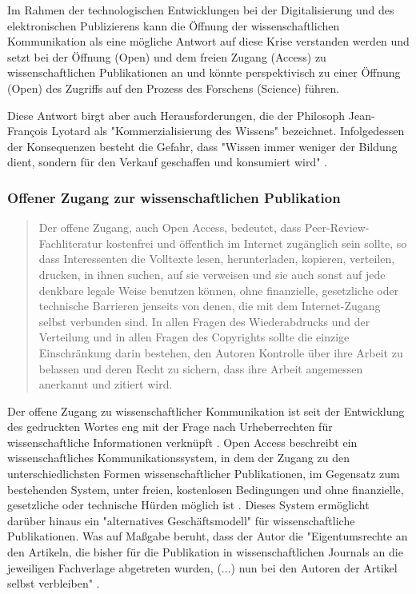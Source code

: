 Im Rahmen der technologischen Entwicklungen bei der Digitalisierung und des elektronischen Publizierens kann die Öffnung der wissenschaftlichen Kommunikation als eine mögliche Antwort auf diese Krise verstanden werden und setzt bei der Öffnung (Open) und dem freien Zugang (Access) zu wissenschaftlichen Publikationen an und könnte perspektivisch zu einer Öffnung (Open) des Zugriffs auf den Prozess des Forschens (Science) führen.

Diese Antwort birgt aber auch Herausforderungen, die der Philosoph Jean-François Lyotard als "Kommerzialisierung des Wissens" \cite{Das_postmoderne_Wissen_Ein_Bericht} bezeichnet. Infolgedessen der Konsequenzen besteht die Gefahr, dass "Wissen immer weniger der Bildung dient, sondern für den Verkauf geschaffen und konsumiert wird" \cite{hagner_2015_sache_buches}.

\subsubsection{Offener Zugang zur wissenschaftlichen Publikation}

\begin{quote}
Der offene Zugang, auch Open Access, bedeutet, dass Peer-Review-Fachliteratur kostenfrei und öffentlich im Internet zugänglich sein sollte, so dass Interessenten die Volltexte lesen, herunterladen, kopieren, verteilen, drucken, in ihnen suchen, auf sie verweisen und sie auch sonst auf jede denkbare legale Weise benutzen können, ohne finanzielle, gesetzliche oder technische Barrieren jenseits von denen, die mit dem Internet-Zugang selbst verbunden sind. In allen Fragen des Wiederabdrucks und der Verteilung und in allen Fragen des Copyrights sollte die einzige Einschränkung darin bestehen, den Autoren Kontrolle über ihre Arbeit zu belassen und deren Recht zu sichern, dass ihre Arbeit angemessen anerkannt und zitiert wird.
\cite{boai_2012}
\end{quote}

Der offene Zugang zu wissenschaftlicher Kommunikation ist seit der Entwicklung des gedruckten Wortes eng mit der Frage nach Urheberrechten für wissenschaftliche Informationen verknüpft \cite{Case_2000}. Open Access beschreibt ein wissenschaftliches Kommunikationssystem, in dem der Zugang zu den unterschiedlichsten Formen wissenschaftlicher Publikationen, im Gegensatz zum bestehenden System, unter freien, kostenlosen Bedingungen und ohne finanzielle, gesetzliche oder technische Hürden möglich ist \cite{WD_bundestag_2009}. Dieses System ermöglicht darüber hinaus ein "alternatives Geschäftsmodell"\cite{lewis_2012_inevitability} für wissenschaftliche Publikationen. Was auf Maßgabe beruht, dass der Autor die "Eigentumsrechte an den Artikeln, die bisher für die Publikation in wissenschaftlichen Journals an die jeweiligen Fachverlage abgetreten wurden, (...) nun bei den Autoren der Artikel selbst verbleiben" \cite{Hess_2006}.

